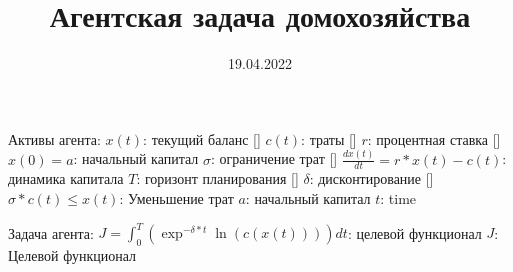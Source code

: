\documentclass{a_model}
\title{Агентская задача домохозяйства}
\date{19.04.2022}
\begin{document}
Активы агента:
    $x(t)$: текущий баланс []
    $c(t)$: траты []
    $r$: процентная ставка []
    $x(0) = a$: начальный капитал
    $\sigma$: ограничение трат []
    $\frac{dx(t)}{dt} = r*x(t)-c(t)$: динамика капитала
    $T$: горизонт планирования []
    $\delta$: дисконтирование []
    $\sigma*c(t)\leq x(t)$: Уменьшение трат
    $a$: начальный капитал
    $t$: time

Задача агента:
    $J = \int_0^T (\exp^{-\delta*t} \ln(c(x(t))))dt$: целевой функционал
    $J$: Целевой функционал
\end{document}
